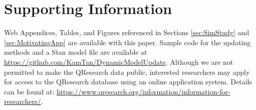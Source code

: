 \documentclass[]{article}
\begin{document}




\section*{Supporting Information}
Web Appendices, Tables, and Figures referenced in Sections \ref{sec:SimStudy} and \ref{sec:MotivatingApp} are available with this paper. Sample code for the updating methods and a Stan model file are available at \url{https://github.com/KamTan/DynamicModelUpdate}. Although we are not permitted to make the QResearch data public, interested researchers may apply for access to the QResearch database using an online application system. Details can be found at: \url{https://www.qresearch.org/information/information-for-researchers/}. 
\end{document}
